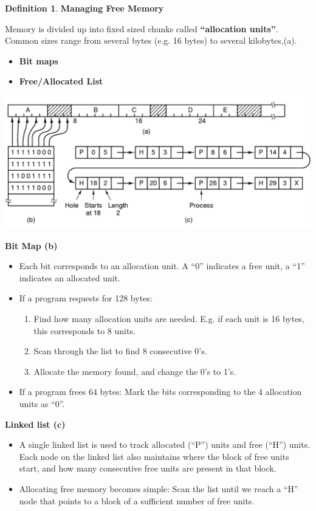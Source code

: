 \documentclass[11pt,a4paper]{article}
\theoremstyle{definition}
\newtheorem{definition}{Definition}[section]
\newenvironment{myitemize}
{ \begin{itemize}
    \setlength{\itemsep}{5pt}
    \setlength{\parskip}{0pt}
    \setlength{\parsep}{0pt}     }
{ \end{itemize}                  }
\newenvironment{myenumerate}
{ \begin{enumerate}
    \setlength{\itemsep}{5pt}
    \setlength{\parskip}{0pt}
    \setlength{\parsep}{0pt}     }
{ \end{enumerate}                }
\begin{document}
\begin{definition}{\textbf{Managing Free Memory}}
	
\begin{minipage}{0.5\linewidth}
Memory is divided up into fixed sized chunks called \textbf{``allocation units''}. Common sizes range from several bytes (e.g. 16 bytes) to several kilobytes,(a).
\begin{myitemize}
	\item \textbf{Bit maps}
	\item \textbf{Free/Allocated List}
\end{myitemize}
	
\end{minipage}
\begin{minipage}{0.5\linewidth}
	\includegraphics[width=\linewidth]{m4/freeMemoryManagement}
\end{minipage}

\noindent\textbf{Bit Map (b)}
\begin{myitemize}
	\item Each bit corresponds to an allocation unit. A ``0'' indicates a free unit, a ``1'' indicates an allocated unit.
	\item If a program requests for 128 bytes:
	\begin{myenumerate}
		\item Find how many allocation units are needed. E.g. if each unit is 16 bytes, this corresponds to 8 units.
		\item Scan through the list to find 8 consecutive 0's.
		\item Allocate the memory found, and change the 0's to 1's.
	\end{myenumerate}
	\item If a program frees 64 bytes: Mark the bits corresponding to the 4 allocation units as ``0''.

\end{myitemize}

\noindent\textbf{Linked list (c)}
\begin{myitemize}
	\item A single linked list is used to track allocated (``P'') units and free (``H'') units. Each node on the linked list also maintains where the block of free units start, and how many consecutive free units are present in that block.
	\item Allocating free memory becomes simple: Scan the list until we reach a ``H'' node that points to a block of a sufficient number of free units.
	\vspace{2mm}
	

\end{myitemize}
\end{definition}
\end{document}
